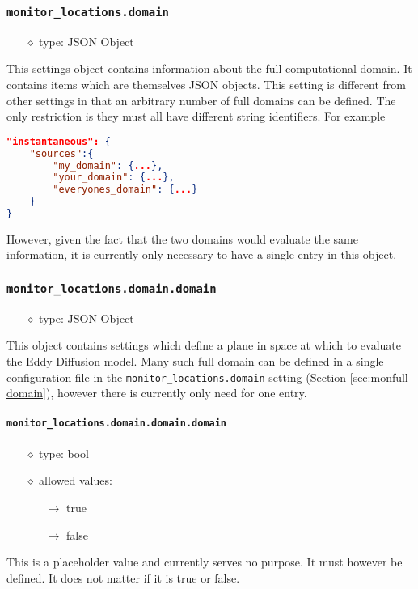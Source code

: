 \documentclass[]{article}
\def\code#1{\texttt{#1}}
\begin{document}
\subsubsection{\code{monitor\_locations.domain}}\label{sec:mondomain}
\begin{itemize}
    \item[$\diamond$] type: JSON Object 
\end{itemize}
This settings object contains information about the full computational domain.
It contains items which are themselves JSON objects. This setting is different
from other settings in that an arbitrary number of full domains can be defined.
The only restriction is they must all have different string identifiers. For
example\\
\begin{lstlisting}[language=json,firstnumber=1]
"instantaneous": {
    "sources":{
        "my_domain": {...},
        "your_domain": {...},
        "everyones_domain": {...}
    }
}
\end{lstlisting}
However, given the fact that the two domains would evaluate the same
information, it is currently only necessary to have a single entry in this
object.


\subsubsection{\code{monitor\_locations.domain.domain}}
\begin{itemize}
    \item[$\diamond$] type: JSON Object 
\end{itemize}
This object contains settings which define a plane in space at which to evaluate
the Eddy Diffusion model. Many such full domain can be defined in a single
configuration file in the \code{monitor\_locations.domain} setting (Section
\ref{sec:monfull domain}), however there is currently only need for one entry.


\paragraph{\code{monitor\_locations.domain.domain.domain}}
\begin{itemize}
    \item[$\diamond$] type: bool 
    \item[$\diamond$] allowed values:
    \begin{itemize}
        \item[$\rightarrow$] true
        \item[$\rightarrow$] false
    \end{itemize}
\end{itemize}
This is a placeholder value and currently serves no purpose. It must however be
defined. It does not matter if it is true or false.
\end{document}
